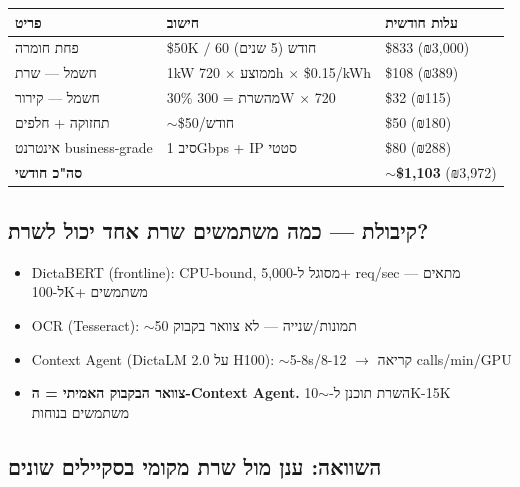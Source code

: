 \documentclass[11pt]{article}
\newcommand{\en}[1]{\textenglish{#1}}
\begin{document}
\begin{longtable}{|>{\raggedright\arraybackslash}p{4.0cm}|>{\raggedright\arraybackslash}p{5.5cm}|>{\raggedright\arraybackslash}p{3.5cm}|}
\hline
\rowcolor{hdr}
\textbf{פריט} & \textbf{חישוב} & \textbf{עלות חודשית} \\
\hline
\endhead
פחת חומרה & \en{\$50K} $/$ \en{60} חודש (\en{5} שנים) & \en{\$833} (₪\en{3,000}) \\ \hline
\rowcolor{ltgray}
חשמל — שרת & \en{1kW} ממוצע $\times$ \en{720h} $\times$ \en{\$0.15/kWh} & \en{\$108} (₪\en{389}) \\ \hline
חשמל — קירור & \en{30\%} מהשרת = \en{300W} $\times$ \en{720} & \en{\$32} (₪\en{115}) \\ \hline
\rowcolor{ltgray}
תחזוקה + חלפים & $\sim$\en{\$50}/חודש & \en{\$50} (₪\en{180}) \\ \hline
אינטרנט \en{business-grade} & סיב \en{1Gbps} + \en{IP} סטטי & \en{\$80} (₪\en{288}) \\ \hline
\rowcolor{ltgray}
\textbf{סה"כ חודשי} & & \textbf{$\sim$\en{\$1,103}} (₪\en{3,972}) \\ \hline
\end{longtable}

\subsection*{קיבולת — כמה משתמשים שרת אחד יכול לשרת?}

\begin{itemize}[leftmargin=*]
  \item \en{DictaBERT} (\en{frontline}): \en{CPU-bound}, מסוגל ל-\en{5,000}+ \en{req/sec} — מתאים ל-\en{100K}+ משתמשים
  \item \en{OCR} (\en{Tesseract}): $\sim$\en{50} תמונות/שנייה — לא צוואר בקבוק
  \item \en{Context Agent} (\en{DictaLM 2.0} על \en{H100}): $\sim$\en{5-8s}/קריאה $\rightarrow$ \en{8-12 calls/min/GPU}
  \item \textbf{צוואר הבקבוק האמיתי = ה-\en{Context Agent}.} השרת תוכנן ל-$\sim$\en{10K-15K} משתמשים בנוחות
\end{itemize}

\subsection*{השוואה: ענן מול שרת מקומי בסקיילים שונים}
\end{document}
